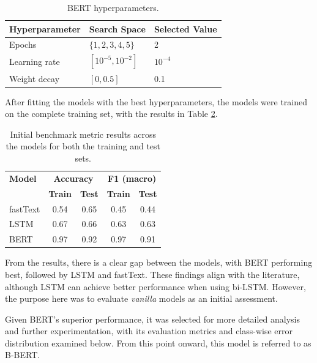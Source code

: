 \documentclass[conference]{IEEEtran}
\begin{document}
\begin{table}[H]
    \begin{subtable}[t]{0.45\textwidth}
        \centering
        \begin{tabular}{lll}
        \toprule
        \textbf{Hyperparameter} \phantom{aaah} & \textbf{Search Space} \phantom{aaa} & \textbf{Selected Value} \\
        \midrule
        Epochs & $\{1,2,3,4,5\}$ & 2 \\
        Learning rate & $[10^{-5}, 10^{-2}]$ & $10^{-4}$ \\
        Weight decay & $[0, 0.5]$ & 0.1 \\
        \bottomrule
        \end{tabular}
        \vspace{.3em}
        \caption{BERT hyperparameters.}
        \label{parameters_basebert}
    \end{subtable}
\end{table}

After fitting the models with the best hyperparameters, the models were trained on the complete training set, with the results in Table \ref{basemodel_models}.
\begin{table}[H]
\centering
\caption{Initial benchmark metric results across the models for both the training and test sets.}
\label{basemodel_models}
\begin{tabular}{lcccc}
\toprule
\textbf{Model} & \multicolumn{2}{c}{\textbf{Accuracy}} & \multicolumn{2}{c}{\textbf{F1 (macro)}} \\
\cmidrule(lr){2-3} \cmidrule(lr){4-5}
 & \textbf{Train} & \textbf{Test} & \textbf{Train} & \textbf{Test} \\
\midrule
fastText & 0.54 & 0.65 & 0.45 & 0.44 \\
LSTM & 0.67 & 0.66 & 0.63 & 0.63 \\
BERT & 0.97 & 0.92 & 0.97 & 0.91 \\
\bottomrule
\end{tabular}
\end{table}

From the results, there is a clear gap between the models, with BERT performing best, followed by LSTM and fastText. These findings align with the literature, although LSTM can achieve better performance when using bi-LSTM. However, the purpose here was to evaluate \textit{vanilla} models as an initial assessment.

Given BERT's superior performance, it was selected for more detailed analysis and further experimentation, with its evaluation metrics and class-wise error distribution examined below. From this point onward, this model is referred to as B-BERT. 
\end{document}

